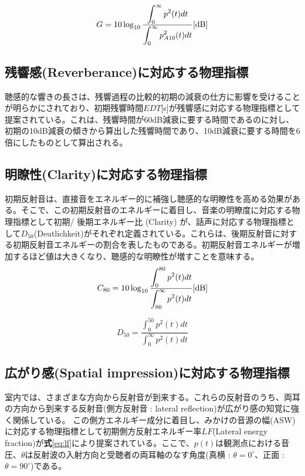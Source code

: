 \begin{equation}
  \label{eq:STG}
  G = 10\log_{10}{\frac{\displaystyle\int_0^{\infty}p^2(t)dt}{\displaystyle\int_0^{\infty}p_{A10}^2(t)dt}} \textrm{[dB]}
\end{equation}

\subsection{残響感(Reverberance)に対応する物理指標}
聴感的な響きの長さは、残響過程の比較的初期の減衰の仕方に影響を受けることが明らかにされており、初期残響時間$EDT$[s]が残響感に対応する物理指標として提案されている。これは、残響時間が60dB減衰に要する時間であるのに対し、初期の10dB減衰の傾きから算出した残響時間であり、10dB減衰に要する時間を6倍にしたものとして算出される。

\subsection{明瞭性(Clarity)に対応する物理指標}
初期反射音は、直接音をエネルギー的に補強し聴感的な明瞭性を高める効果がある。そこで、この初期反射音のエネルギーに着目し、音楽の明瞭度に対応する物理指標として初期/ 後期エネルギー比 \Clarity(Clarity) が、話声に対応する物理指標として$D_{50}$(Deutlichkeit)がそれぞれ定義されている。これらは、後期反射音に対する初期反射音エネルギーの割合を表したものである。初期反射音エネルギーが増加するほど値は大きくなり、聴感的な明瞭性が増すことを意味する。
\begin{equation}
    \label{eq:c80}
  C_{80} = 10\log_{10}{\frac{\displaystyle\int_0^{80}p^2(t)dt}{\displaystyle\int_{80}^{\infty}p^2(t)dt}} \textrm{[dB]}
\end{equation}

\begin{equation}
    \label{eq:c80}
  D_{50} = {\frac{\displaystyle\int_0^{50}p^2(t)dt}{\displaystyle\int_0^{\infty}p^2(t)dt}} 
\end{equation}

\subsection{広がり感(Spatial impression)に対応する物理指標}
室内では、さまざまな方向から反射音が到来する。これらの反射音のうち、両耳の方向から到来する反射音(側方反射音 : lateral reflection)が広がり感の知覚に強く関係している。
この側方エネルギー成分に着目し、みかけの音源の幅(ASW)に対応する物理指標として初期側方反射エネルギー率$LF$(Lateral energy fraction)が\textbf{式}\ref{eq:lf}により提案されている。ここで、$p(t)$は観測点における音圧、$\theta$は反射波の入射方向と受聴者の両耳軸のなす角度(真横 : $\theta = 0^\circ$、正面 : $\theta = 90^\circ$)である。

